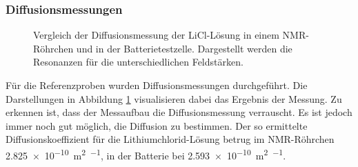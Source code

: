 \documentclass[a4paper, 11pt, headsepline,footsepline,twoside,abstract]{scrbook}
\begin{document}
\subsubsection{Diffusionsmessungen}
\begin{figure}
   \centering
       \vspace{10mm}
       \vspace{6mm}
	\caption{Vergleich der Diffusionsmessung der LiCl-Lösung in einem NMR-Röhrchen und in der Batterietestzelle. Dargestellt werden die Resonanzen für die unterschiedlichen Feldstärken.}
   	\label{vergleich_diff}
\end{figure}
Für die Referenzproben wurden Diffusionsmessungen durchgeführt. Die Darstellungen in Abbildung \ref{vergleich_diff} visualisieren dabei das Ergebnis der Messung. Zu erkennen ist, dass der Messaufbau die Diffusionsmessung verrauscht. Es ist jedoch immer noch gut möglich, die Diffusion zu bestimmen. Der so ermittelte Diffusionskoeffizient für die Lithiumchlorid-Lösung betrug im NMR-Röhrchen  \SI{2.825e-10}{\square\meter\per\sec}, in der Batterie bei  \SI{2.593e-10}{\square\meter\per\sec}.
\end{document}
